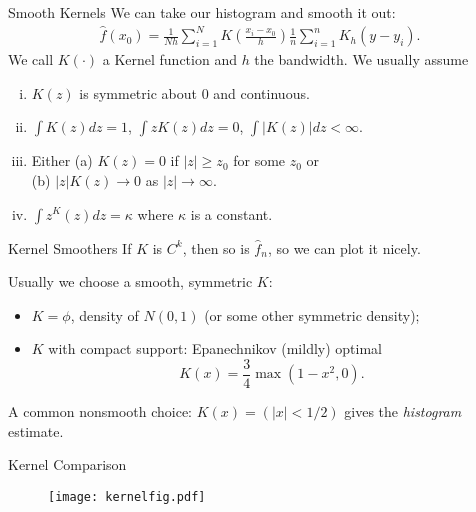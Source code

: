 \documentclass[11pt,handout,xcolor=pdftex,dvipsnames,table,mathserif]{beamer}
\begin{document}
\begin{frame}{Smooth Kernels}
We can take our histogram and smooth it out:
\begin{eqnarray*}
\hat{f}(x_0) = \frac{1}{Nh} \sum_{i=1}^N  K  \left(\frac{x_i - x_0}{h} \right)  \frac{1}{n}\sum_{i=1}^n K_h\left(
y-y_i\right).
\end{eqnarray*}
We call $K(\cdot)$ a \alert{Kernel function} and $h$ the \alert{bandwidth}. We usually assume
\begin{enumerate}[(i)]
\item $K(z)$ is symmetric about $0$ and continuous.
\item $\int K(z) d z = 1$,  $\int z K(z) d z = 0$,  $\int |K(z)| d z < \infty$.
\item Either (a) $K(z) = 0$ if $|z| \geq z_0$ for some $z_0$ or \\
(b) $|z| K(z) \rightarrow 0$ as $|z| \rightarrow \infty$.
\item $\int z^ K(z) d z = \kappa$ where $\kappa$ is a constant.
\end{enumerate}
\end{frame}

\begin{frame}{Kernel Smoothers}
If $K$ is $C^k$, then so is ${\hat f}_n$, so we can plot it nicely.

\pause

Usually we choose a smooth, symmetric $K$:



\pause




\begin{itemize}[<+->]
\item $K=\phi$, density of $N(0,1)$ (or some other symmetric density);
\item $K$ with compact support: Epanechnikov (mildly) optimal
\[
K(x)= \frac{3}{4} \max(1-x^2,0).
\]
\end{itemize}
\pause
A common nonsmooth choice: $K(x)=(|x|<1/2)$ gives the {\em histogram}
estimate.
\end{frame}

\begin{frame}{Kernel Comparison}
\begin{figure}[htbp]
\begin{center}
\texttt{[image: kernelfig.pdf]}
\label{classOLS}
\end{center}
\end{figure}
\end{frame}
\end{document}
